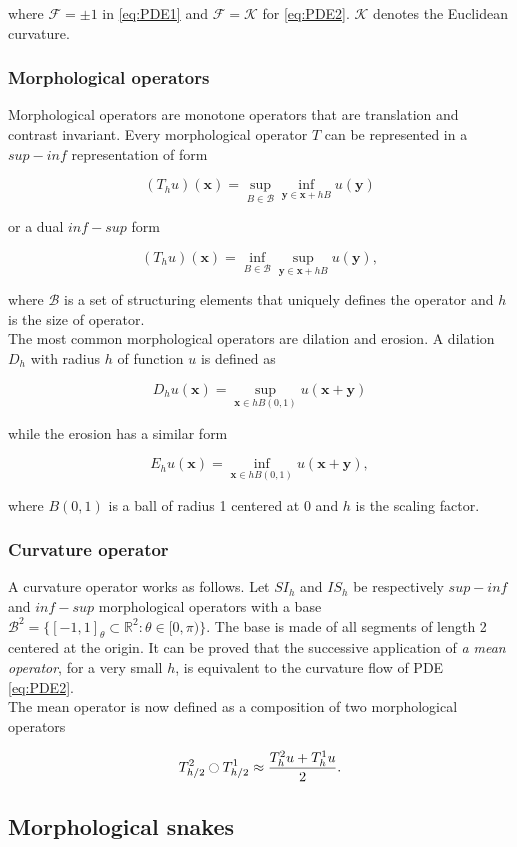 where $\mathcal{F} = \pm 1$ in \ref{eq:PDE1} and $\mathcal{F} = \mathcal{K}$ for \ref{eq:PDE2}. $\mathcal{K}$ denotes the Euclidean curvature.



\subsubsection{Morphological operators} 

Morphological operators are monotone operators that are translation and contrast invariant. Every morphological operator $T$ can be represented in a $sup-inf$ representation of form 

\begin{equation}
	(T_hu)(\mathbf{x}) = \sup_{B \in \mathcal{B}} \inf_{\mathbf{y} \in \mathbf{x} + hB}u(\mathbf{y})
\end{equation}

or a dual $inf-sup$ form

\begin{equation}
	(T_hu)(\mathbf{x}) = \inf_{B \in \mathcal{B}} \sup_{\mathbf{y} \in \mathbf{x} + hB}u(\mathbf{y}),
\end{equation}

where $\mathcal{B}$ is a set of structuring elements that uniquely defines the operator and $h$ is the size of operator. \\

The most common morphological operators are dilation and erosion. A dilation $D_h$ with radius $h$ of function $u$ is defined as 

\begin{equation}
	D_hu(\mathbf{x}) = \sup_{\mathbf{x} \in hB(0,1)} u(\mathbf{x} + \mathbf{y})
\end{equation}

while the erosion has a similar form

\begin{equation}
	E_hu(\mathbf{x}) = \inf_{\mathbf{x} \in hB(0,1)} u(\mathbf{x} + \mathbf{y}),
\end{equation}

 where $B(0,1)$ is a ball of radius 1 centered at 0 and $h$ is the scaling factor.
 
\subsubsection{Curvature operator}

A curvature operator works as follows. Let $SI_h$ and $IS_h$ be respectively $sup-inf$ and $inf-sup$ morphological operators with a base $\mathcal{B}^2 = \{ [-1,1]_{\theta} \subset \mathbb{R}^2 : \theta \in [0, \pi) \}$. The base is made of all segments of length 2 centered at the origin. It can be proved that the successive application of \textit{a mean operator}, for a very small $h$, is equivalent to the curvature flow of PDE \ref{eq:PDE2}. \\

The mean operator is now defined as a composition of two morphological operators

\begin{equation}
	T_{h/2}^2 \ocircle T_{h/2}^1 \approx \frac{T_h^2u + T_h^1u}{2}.
\end{equation}

\subsection{Morphological snakes}